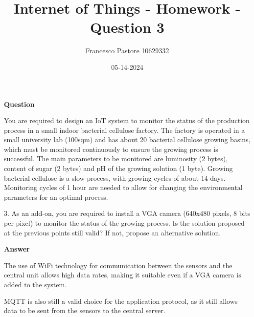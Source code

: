 \documentclass[12pt]{article}
\title{Internet of Things - Homework - Question 3}
\author{Francesco Pastore 10629332}
\date{05-14-2024}
\begin{document}
\maketitle

\textbf{Question}

You are required to design an IoT system to monitor the status of the production process in a small indoor bacterial cellulose factory.
The factory is operated in a small university lab (100sqm) and has about 20 bacterial cellulose growing basins, which must be monitored continuously to ensure the growing process is successful.
The main parameters to be monitored are luminosity (2 bytes), content of sugar (2 bytes) and pH of the growing solution (1 byte).
Growing bacterial cellulose is a slow process, with growing cycles of about 14 days.
Monitoring cycles of 1 hour are needed to allow for changing the environmental parameters for an optimal process.

3. As an add-on, you are required to install a VGA camera (640x480 pixels, 8 bits per pixel) to monitor the status of the growing process. Is the solution proposed at the previous points still valid? If not, propose an alternative solution.

\textbf{Answer}

The use of WiFi technology for communication between the sensors and the central unit allows high data rates, making it suitable even if a VGA camera is added to the system.

MQTT is also still a valid choice for the application protocol, as it still allows data to be sent from the sensors to the central server.
\end{document}
